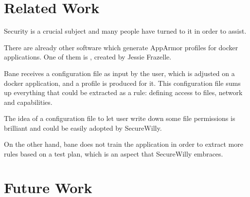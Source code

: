 \section{Related Work}

Security is a crucial subject and many people have turned to it in order to assist.

There are already other software which generate AppArmor profiles for docker applications. One of them is , created by Jessie Frazelle. \cite{bane}

Bane receives a configuration file as input by the user, which is adjusted on a docker application, and a profile is produced for it. This configuration file sums up everything that could be extracted as a rule: defining access to files, network and capabilities.

The idea of a configuration file to let user write down some file permissions is brilliant and could be easily adopted by SecureWilly.

On the other hand, bane does not train the application in order to extract more rules based on a test plan, which is an aspect that SecureWilly embraces.

\section{Future Work}


